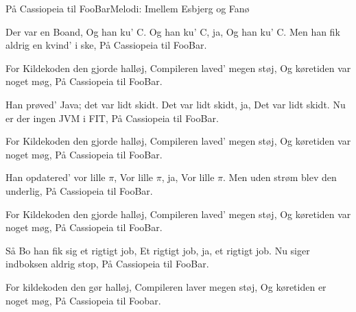 \begin{sang}{På Cassiopeia til FooBar}{Melodi: Imellem Esbjerg og Fanø}
\begin{vers}
Der var en Boand,
Og han ku' C.
Og han ku' C, ja,
Og han ku' C.
Men han fik aldrig en kvind' i ske,
På Cassiopeia til FooBar.
\end{vers}

\begin{omkvaed}
For Kildekoden den gjorde halløj,
Compileren laved' megen støj,
Og køretiden var noget møg,
På Cassiopeia til FooBar.
\end{omkvaed}

\begin{vers}
Han prøved' Java; det var lidt skidt.
Det var lidt skidt, ja,
Det var lidt skidt.
Nu er der ingen JVM i FIT,
På Cassiopeia til FooBar.
\end{vers}

\begin{omkvaed}
For Kildekoden den gjorde halløj,
Compileren laved' megen støj,
Og køretiden var noget møg,
På Cassiopeia til FooBar.
\end{omkvaed}

\begin{vers}
Han opdatered' vor lille $\pi$,
Vor lille $\pi$, ja,
Vor lille $\pi$.
Men uden strøm blev den underlig,
På Cassiopeia til FooBar.
\end{vers}

\begin{omkvaed}
For Kildekoden den gjorde halløj,
Compileren laved' megen støj,
Og køretiden var noget møg,
På Cassiopeia til FooBar.
\end{omkvaed}

\begin{vers}
Så Bo han fik sig et rigtigt job,
Et rigtigt job, ja,
et rigtigt job.
Nu siger indboksen aldrig stop,
På Cassiopeia til FooBar.
\end{vers}

\begin{vers}
For kildekoden den gør halløj,
Compileren laver megen støj,
Og køretiden er noget møg,
På Cassiopeia til Foobar.

\end{vers}
\end{sang}

